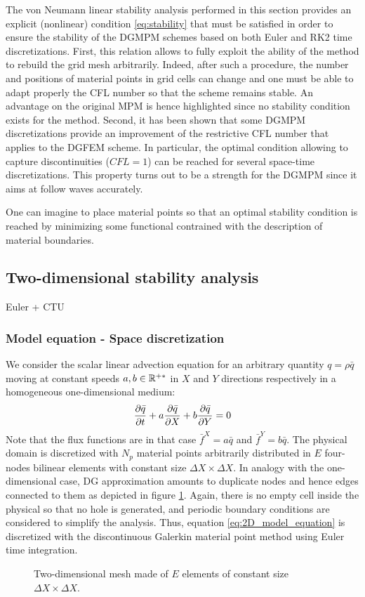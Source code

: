 The von Neumann linear stability analysis performed in this section provides an explicit (nonlinear) condition \eqref{eq:stability} that must be satisfied in order to ensure the stability of the DGMPM schemes based on both Euler and RK2 time discretizations. First, this relation allows to fully exploit the ability of the method to rebuild the grid mesh arbitrarily. Indeed, after such a procedure, the number and positions of material points in grid cells can change and one must be able to adapt properly the CFL number so that the scheme remains stable. An advantage on the original MPM is hence highlighted since no stability condition exists for the method. Second, it has been shown that some DGMPM discretizations provide an improvement of the restrictive CFL number that applies to the DGFEM scheme. In particular, the optimal condition allowing to capture discontinuities ($CFL=1$) can be reached for several space-time discretizations. This property turns out to be a strength for the DGMPM since it aims at follow waves accurately.

One can imagine to place material points so that an optimal stability condition is reached by minimizing some functional contrained with the description of material boundaries.

\subsection{Two-dimensional stability analysis}
Euler + CTU
\subsubsection*{Model equation - Space discretization}

We consider the scalar linear advection equation for an arbitrary quantity $q=\rho \bar{q}$ moving at constant speeds $a,b \in \mathbb{R}^{+*}$ in $X$ and $Y$ directions respectively in a homogeneous one-dimensional medium:
\begin{equation}
  \label{eq:2D_model_equation}
  \frac{\partial \bar{q}}{\partial t} + a\frac{\partial \bar{q}}{\partial X} + b\frac{\partial \bar{q}}{\partial Y}= 0
\end{equation}
Note that the flux functions are in that case $\bar{f}^X = a\bar{q}$ and $\bar{f}^Y = b\bar{q}$. The physical domain is discretized with $N_p$ material points arbitrarily distributed in $E$ four-nodes bilinear elements with constant size $\Delta X \times \Delta X$. In analogy with the one-dimensional case, DG approximation amounts to duplicate nodes and hence edges connected to them as depicted in figure \ref{fig:2Dmesh}. Again, there is no empty cell inside the physical so that no hole is generated, and periodic boundary conditions are considered to simplify the analysis. Thus, equation \eqref{eq:2D_model_equation} is discretized with the discontinuous Galerkin material point method using Euler time integration.
\begin{figure}[h!]
  \centering
  
  \caption{Two-dimensional mesh made of $E$ elements of constant size $\Delta X \times \Delta X$.}\label{fig:2Dmesh}
\end{figure}


